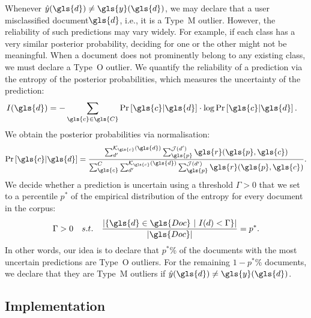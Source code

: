 Whenever $\hat{y}(\gls{d}) \neq \gls{y}(\gls{d})$, we may declare that a user misclassified document$\gls{d}$, i.e., it is a Type~M outlier. 
However, the reliability of such predictions may vary widely. For example, if each class has a very similar posterior probability, deciding for one or the other might not be meaningful. When a document does not prominently belong to any existing class, we must declare a Type~O outlier. We quantify the reliability of a prediction via the entropy of the posterior probabilities, which measures the uncertainty of the prediction: 
\begin{align}
    I(\gls{d}) &= - \sum_{\gls{c} \in \gls{C}} \Pr\left[\gls{c}|\gls{d}\right] \cdot  \log \Pr\left[\gls{c}|\gls{d}\right].
\end{align}
We obtain the posterior probabilities via normalisation: 
\begin{align}
    \Pr\left[\gls{c}|\gls{d}\right] = \frac{\sum_{d'}^{\mathcal{K}_{\gls{c}}(\gls{d})} \sum_{\gls{p}}^{\mathcal{J}(d')} \gls{r}(\gls{p},\gls{c})}{\sum_{\gls{c}}^{C}  \sum_{d'}^{\mathcal{K}_{\gls{c}}(\gls{d})} \sum_{\gls{p}}^{\mathcal{J}(d')} \gls{r}(\gls{p},\gls{c})}.
\end{align}
We decide whether a prediction is uncertain using a threshold $\Gamma > 0$ that we set to a percentile $p^*$ of the empirical distribution of the entropy for every document in the corpus:
\begin{align} 
\label{eq:gamma}
    \Gamma > 0 \quad s.t. \quad \frac{|\{\gls{d} \in \gls{Doc}~|~I(d) < \Gamma\}|}{|\gls{Doc}|} = p^*.
\end{align}
In other words, our idea is to declare that $p^*$\% of the documents with the most uncertain predictions are Type~O outliers. For the remaining $1-p^*$\% documents, we declare that they are Type~M outliers if $\hat{y}(\gls{d}) \neq \gls{y}(\gls{d})$. 

\subsection{Implementation}
\label{sec: Implementation}

